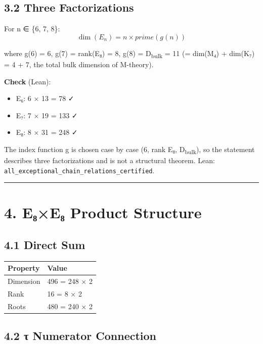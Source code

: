 \documentclass[11pt,a4paper]{article}
\begin{document}
\subsection{3.2 Three Factorizations}\label{three-factorizations}

For n ∈ \{6, 7, 8\}: \[\dim(E_n) = n \times prime(g(n))\]

where g(6) = 6, g(7) = rank(E₈) = 8, g(8) = D\textsubscript{bulk} = 11 (= dim(M₄) + dim(K₇) = 4 + 7, the total bulk dimension of M-theory).

\textbf{Check} (Lean):

\begin{itemize}
\tightlist
\item
  E₆: 6 × 13 = 78 ✓
\item
  E₇: 7 × 19 = 133 ✓
\item
  E₈: 8 × 31 = 248 ✓
\end{itemize}

The index function g is chosen case by case (6, rank E₈, D\textsubscript{bulk}), so the statement describes three factorizations and is not a structural theorem. Lean: \texttt{all\_\allowbreak{}exceptional\_\allowbreak{}chain\_\allowbreak{}relations\_\allowbreak{}certified}.

\begin{center}\rule{\linewidth}{0.5pt}\end{center}

\section{4. E₈×E₈ Product Structure}\label{eux2088eux2088-product-structure}

\subsection{4.1 Direct Sum}\label{direct-sum}

\begin{longtable}[]{@{}ll@{}}
\toprule\noalign{}
Property & Value \\
\midrule\noalign{}
\endhead
\bottomrule\noalign{}
\endlastfoot
Dimension & 496 = 248 × 2 \\
Rank & 16 = 8 × 2 \\
Roots & 480 = 240 × 2 \\
\end{longtable}

\subsection{4.2 τ Numerator Connection}\label{ux3c4-numerator-connection}
\end{document}
